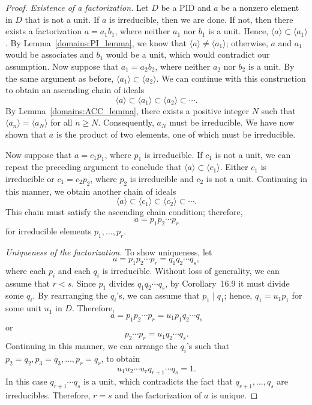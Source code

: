 \begin{proof}
{\em Existence of a factorization.}
Let $D$ be a PID and $a$ be a nonzero element in $D$ that is not a
unit. If $a$ is irreducible, then we are done. If not, then there
exists a factorization $a = a_1 b_1$, where neither $a_1$ nor $b_1$ is
a unit. Hence, $\langle a \rangle \subset \langle a_1 \rangle$. By
Lemma~\ref{domains:PI_lemma}, we know that $\langle a \rangle \neq \langle a_1 \rangle$;
otherwise, $a$ and $a_1$ would be associates and $b_1$ would be a unit,
which would contradict our assumption. Now suppose that $a_1 =  a_2
b_2$, where neither $a_2$ nor $b_2$ is a unit. By the same argument as
before, $\langle a_1 \rangle \subset \langle a_2 \rangle$.  We can
continue with this construction to obtain an ascending chain of ideals
\[
\langle a \rangle \subset \langle a_1 \rangle \subset \langle a_2
\rangle \subset \cdots.
\]
By Lemma~\ref{domains:ACC_lemma}, there exists a positive integer $N$ such that
$\langle a_n \rangle = \langle a_N \rangle$ for all $n \geq N$. 
Consequently, $a_N$ must be irreducible. We have now shown that $a$ is
the product of two elements, one of which must be irreducible.  



Now suppose that $a = c_1 p_1$, where $p_1$ is irreducible. If $c_1$
is not a unit, we can repeat the preceding argument to conclude that
$\langle a \rangle \subset \langle c_1 \rangle$. Either $c_1$ is
irreducible or $c_1 = c_2 p_2$, where $p_2$ is irreducible and $c_2$
is not a unit.  Continuing in this manner, we obtain another chain of
ideals
\[
\langle a \rangle \subset \langle c_1 \rangle \subset \langle c_2
\rangle \subset \cdots.	   
\]
This chain must satisfy the ascending chain condition; therefore, 
\[
a = p_1 p_2 \cdots p_r
\]
for irreducible elements $p_1, \ldots, p_r$.


{\em Uniqueness of the factorization.}
To show uniqueness, let
\[
a= p_1 p_2 \cdots p_r = q_1 q_2 \cdots q_s,
\]
where each $p_i$ and each $q_i$ is irreducible.  Without loss of
generality, we can assume that $r < s$. Since $p_1$ divides $q_1 q_2
\cdots q_s$, by Corollary~16.9 it must divide some $q_i$. By
rearranging the $q_i$'s, we can assume that $p_1 \mid q_1$; hence,
$q_1 = u_1 p_1$ for some unit $u_1$ in $D$. Therefore,
\[
a = p_1 p_2 \cdots p_r = u_1 p_1 q_2 \cdots q_s
\]
or 
\[
p_2 \cdots p_r = u_1 q_2 \cdots q_s.
\]
Continuing in this manner, we can arrange the $q_i$'s such that $p_2
= q_2, p_3 = q_3, \ldots, p_r = q_r$, to obtain
\[
u_1 u_2 \cdots u_r q_{r+1} \cdots q_s = 1.
\]
In this case $q_{r+1} \cdots q_s$ is a unit, which contradicts the
fact that $q_{r+1}, \ldots, q_s$ are irreducibles. Therefore, $r=s$
and the factorization of $a$ is unique.
\end{proof}

